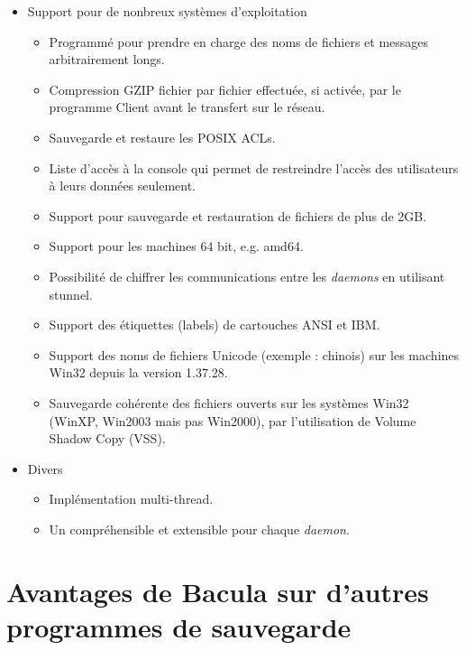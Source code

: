\begin{itemize}
\item Support pour de nonbreux syst\`emes d'exploitation 
  \begin{itemize}
    \item Programm\'e pour prendre en charge des noms de fichiers et messages
    arbitrairement longs.
    \item Compression GZIP fichier par fichier effectu\'ee, si activ\'ee, par  le
    programme Client avant le transfert sur le r\'eseau.
    \item Sauvegarde et restaure les POSIX ACLs.
    \item Liste d'acc\`es \`a la console qui permet de restreindre l'acc\`es des
    utilisateurs \`a leurs donn\'ees seulement.  
    \item Support pour sauvegarde et restauration de fichiers de plus de 2GB.  
    \item Support pour les machines 64 bit, e.g. amd64.  
    \item Possibilit\'e de chiffrer les communications entre les {\it daemons} en
    utilisant stunnel.
   \item Support des \'etiquettes (labels) de cartouches ANSI et IBM.
   \item Support des noms de fichiers Unicode (exemple : chinois) sur les machines Win32 
   depuis la version 1.37.28.
   \item Sauvegarde coh\'erente des fichiers ouverts sur les syst\`emes Win32 (WinXP, Win2003 
   mais pas Win2000), par l'utilisation de Volume Shadow Copy (VSS).
 \end{itemize}

\item Divers
  \begin{itemize}
    \item Impl\'ementation multi-thread.
    \item Un  compr\'ehensible et 
    extensible pour chaque {\it daemon}.
  \end{itemize}
\end{itemize}

\section{Avantages de Bacula sur d'autres programmes de sauvegarde}

